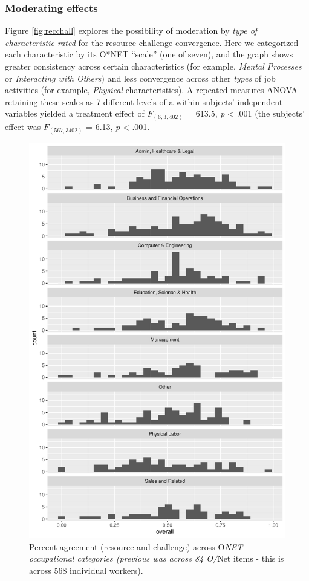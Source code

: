 \documentclass[
  man]{apa6}
\begin{document}
\hypertarget{moderating-effects}{%
\subsubsection{Moderating effects}\label{moderating-effects}}

Figure \ref{fig:recchall} explores the possibility of moderation by \emph{type of characteristic rated} for the resource-challenge convergence. Here we categorized each characteristic by its O*NET ``scale'' (one of seven), and the graph shows greater consistency across certain characteristics (for example, \emph{Mental Processes} or \emph{Interacting with Others}) and less convergence across other \emph{types} of job activities (for example, \emph{Physical} characteristics). A repeated-measures ANOVA retaining these scales as 7 different levels of a within-subjects' independent variables yielded a treatment effect of \(F_{(6, 3,402)}\) = 613.5, \emph{p} \textless{} .001 (the subjects' effect was \(F_{(567, 3402)}\) = 6.13, \emph{p} \textless{} .001.

\begin{figure}
\centering
\includegraphics{SIOP2024convergence_files/figure-latex/workcat-1.pdf}
\caption{\label{fig:workcat}Percent agreement (resource and challenge) across O\emph{NET occupational categories (previous was across 84 O/}Net items - this is across 568 individual workers).}
\end{figure}
\end{document}
